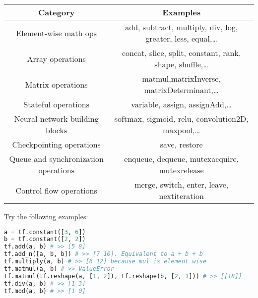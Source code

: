 \documentclass{article}
\begin{document}
	\begin{tabular}{| c | c |}
		\hline
		\rowcolor{cyan}
			\bf Category & \bf Examples\\
		\hline
			Element-wise math ops & add, subtract, multiply, div, log, greater, less, equal,\dots\\
			\rowcolor{LightCyan}
			Array operations & concat, slice, split, constant, rank, shape, shuffle,\dots\\
			Matrix operations & matmul,matrixInverse, matrixDeterminant,\dots\\
			\rowcolor{LightCyan}
			Stateful operations & variable, assign, assignAdd,\dots\\
			Neural network building blocks & softmax, sigmoid, relu, convolution2D, maxpool,\dots\\
			\rowcolor{LightCyan}
			Checkpointing operations & save, restore\\
			Queue and synchronization operations & enqueue, dequeue, mutexacquire, mutexrelease\\
			\rowcolor{LightCyan}
			Control flow operations & merge, switch, enter, leave, nextiteration\\
		\hline
	\end{tabular}
	Try the following examples:
\begin{lstlisting}[language=Python,morekeywords ={as}]
a = tf.constant([3, 6])
b = tf.constant([2, 2])
tf.add(a, b) # >> [5 8]
tf.add_n([a, b, b]) # >> [7 10]. Equivalent to a + b + b
tf.multiply(a, b) # >> [6 12] because mul is element wise
tf.matmul(a, b) # >> ValueError
tf.matmul(tf.reshape(a, [1, 2]), tf.reshape(b, [2, 1])) # >> [[18]]
tf.div(a, b) # >> [1 3]
tf.mod(a, b) # >> [1 0]
\end{lstlisting}
	\medskip
\end{document}
